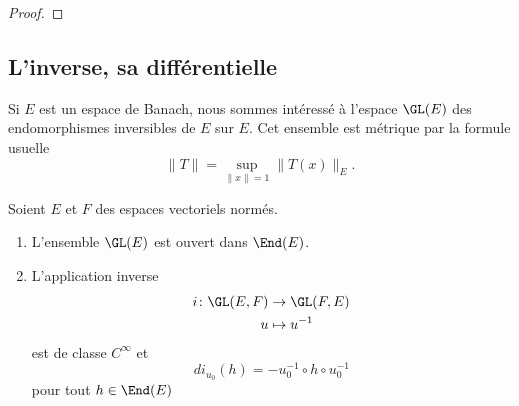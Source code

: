 \begin{proof}
%
%
\end{proof}

\subsection{L'inverse, sa différentielle}

Si \( E\) est un espace de Banach, nous sommes intéressé à l'espace \( \GL(E)\) des endomorphismes inversibles de \( E\) sur \( E\). Cet ensemble est métrique par la formule usuelle
\begin{equation}
    \| T \|=\sup_{\| x \|=1}\| T(x) \|_E.
\end{equation}

\begin{theorem}    \label{ThoCINVBTJ}
    Soient \( E\) et \( F\) des espaces vectoriels normés.
    \begin{enumerate}
        \item
        L'ensemble \( \GL(E)\) est ouvert dans \( \End(E)\).
    \item
        L'application inverse
    \begin{equation}
        \begin{aligned}
        i\colon \GL(E,F)&\to \GL(F,E) \\
        u&\mapsto u^{-1} 
        \end{aligned}
    \end{equation}
    est de classe \( C^{\infty}\) et
    \begin{equation}
        di_{u_0}(h)=-u_0^{-1}\circ h\circ u_0^{-1}
    \end{equation}
    pour tout \( h\in\End(E)\)
    \end{enumerate}
\end{theorem}

